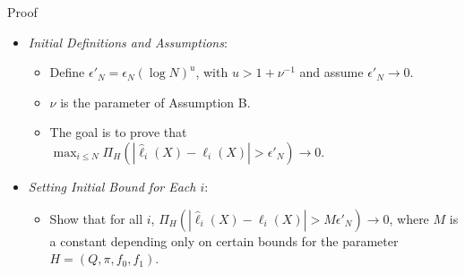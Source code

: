 \documentclass[10pt, aspectratio=169]{beamer}
\begin{document}
\begin{frame}{Proof}
   \begin{itemize}[label=\scalebox{0.5}{$\bullet$}]
        
        \item \textit{Initial Definitions and Assumptions}:
        \begin{itemize}[label=\scalebox{0.5}{$\bullet$}]
            \setlength{\itemsep}{\baselineskip}
            \item Define \(\epsilon'_N = \epsilon_N (\log N)^u\), with \(u > 1 + \nu^{-1}\) and assume \(\epsilon'_N \to 0\).
            \item \(\nu\) is the parameter of Assumption B.
            \item The goal is to prove that \(\max_{i \leq N} \Pi_H(|\hat{\ell}_i(X) - \ell_i(X)| > \epsilon'_N) \to 0\).
        \end{itemize}

        \item \textit{Setting Initial Bound for Each \(i\)}:
        \begin{itemize}[label=\scalebox{0.5}{$\bullet$}]
            \setlength{\itemsep}{\baselineskip}
            \item Show that for all \(i\), \(\Pi_H(|\hat{\ell}_i(X) - \ell_i(X)| > M \epsilon'_N) \to 0\), where \(M\) is a constant depending only on certain bounds for the parameter \(H = (Q, \pi, f_0, f_1)\).
        \end{itemize}
    \end{itemize}
\end{frame}
\end{document}

